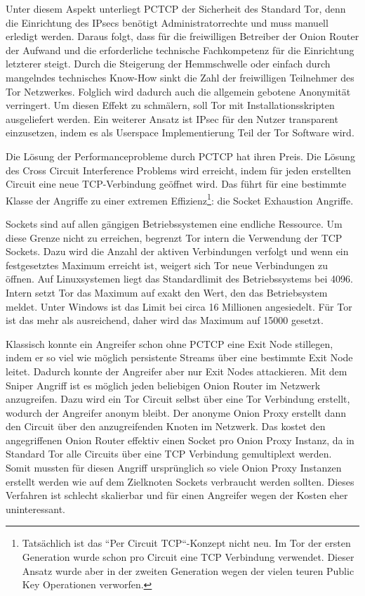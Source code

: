 \documentclass[fleqn,envcountsame,runningheads,10pt,a4paper]{llncs}
\begin{document}
Unter diesem Aspekt unterliegt PCTCP der Sicherheit des Standard Tor, denn die 
Einrichtung des IPsecs benötigt Administratorrechte und muss manuell erledigt 
werden. Daraus folgt, dass für die freiwilligen Betreiber der Onion Router der 
Aufwand und die erforderliche technische Fachkompetenz für die Einrichtung 
letzterer steigt. Durch die Steigerung der Hemmschwelle oder einfach durch 
mangelndes technisches Know-How sinkt die Zahl der freiwilligen Teilnehmer des 
Tor Netzwerkes. Folglich wird dadurch auch die allgemein gebotene Anonymität 
verringert. Um diesen Effekt zu schmälern, soll Tor mit Installationsskripten 
ausgeliefert werden. Ein weiterer Ansatz ist IPsec für den Nutzer transparent 
einzusetzen, indem es als Userspace Implementierung Teil der Tor Software wird.

Die Lösung der Performanceprobleme durch PCTCP hat ihren Preis. Die Lösung 
des Cross Circuit Interference Problems wird erreicht, indem für jeden 
erstellten Circuit eine neue TCP-Verbindung geöffnet wird. Das führt für eine 
bestimmte Klasse der Angriffe zu einer extremen Effizienz\footnote{Tatsächlich 
ist das ``Per Circuit TCP``-Konzept nicht neu. Im Tor der ersten Generation 
wurde schon pro Circuit eine TCP Verbindung verwendet. Dieser Ansatz wurde aber 
in der zweiten Generation wegen der vielen teuren Public Key Operationen 
verworfen.\cite{tor}}: die Socket Exhaustion Angriffe. 

Sockets sind auf allen gängigen Betriebssystemen eine endliche Ressource. Um 
diese Grenze nicht zu erreichen, begrenzt Tor intern die Verwendung der TCP 
Sockets. Dazu wird die Anzahl der aktiven Verbindungen verfolgt und wenn ein 
festgesetztes Maximum erreicht ist, weigert sich Tor neue Verbindungen zu 
öffnen. Auf Linuxsystemen liegt das Standardlimit des Betriebssystems bei 4096. 
Intern setzt Tor das Maximum auf exakt den Wert, den das Betriebsystem meldet. 
Unter Windows ist das Limit bei circa 16 Millionen angesiedelt. Für Tor ist das 
mehr als ausreichend, daher wird das Maximum auf 15000 gesetzt\cite{imux}.

Klassisch konnte ein Angreifer schon ohne PCTCP eine Exit Node stillegen, indem 
er so viel wie möglich persistente Streams über eine bestimmte Exit Node 
leitet. Dadurch konnte der Angreifer aber nur Exit Nodes attackieren. Mit dem 
Sniper Angriff \cite{sniper} ist es möglich jeden beliebigen Onion Router im 
Netzwerk anzugreifen. Dazu wird ein Tor Circuit selbst über eine Tor Verbindung 
erstellt, wodurch der Angreifer anonym bleibt. Der anonyme Onion Proxy erstellt 
dann den Circuit über den anzugreifenden Knoten im Netzwerk. Das kostet den 
angegriffenen Onion Router effektiv einen Socket pro Onion Proxy Instanz, da in 
Standard Tor alle Circuits über eine TCP Verbindung gemultiplext werden. Somit 
mussten für diesen Angriff ursprünglich so viele Onion Proxy Instanzen erstellt 
werden wie auf dem Zielknoten Sockets verbraucht werden sollten. Dieses 
Verfahren ist schlecht skalierbar und für einen Angreifer wegen der Kosten eher 
uninteressant.
\end{document}
